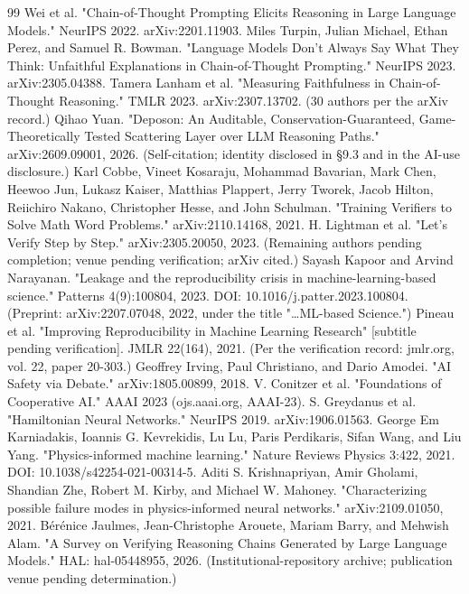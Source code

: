 \documentclass[11pt,a4paper]{article}
\begin{document}
\begin{thebibliography}{99}
 Wei et al. "Chain-of-Thought Prompting Elicits Reasoning in Large Language Models." NeurIPS 2022. arXiv:2201.11903.
 Miles Turpin, Julian Michael, Ethan Perez, and Samuel R. Bowman. "Language Models Don't Always Say What They Think: Unfaithful Explanations in Chain-of-Thought Prompting." NeurIPS 2023. arXiv:2305.04388.
 Tamera Lanham et al. "Measuring Faithfulness in Chain-of-Thought Reasoning." TMLR 2023. arXiv:2307.13702. (30 authors per the arXiv record.)
 Qihao Yuan. "Deposon: An Auditable, Conservation-Guaranteed, Game-Theoretically Tested Scattering Layer over LLM Reasoning Paths." arXiv:2609.09001, 2026. (Self-citation; identity disclosed in §9.3 and in the AI-use disclosure.)
 Karl Cobbe, Vineet Kosaraju, Mohammad Bavarian, Mark Chen, Heewoo Jun, Lukasz Kaiser, Matthias Plappert, Jerry Tworek, Jacob Hilton, Reiichiro Nakano, Christopher Hesse, and John Schulman. "Training Verifiers to Solve Math Word Problems." arXiv:2110.14168, 2021.
 H. Lightman et al. "Let's Verify Step by Step." arXiv:2305.20050, 2023. (Remaining authors pending completion; venue pending verification; arXiv cited.)
 Sayash Kapoor and Arvind Narayanan. "Leakage and the reproducibility crisis in machine-learning-based science." Patterns 4(9):100804, 2023. DOI: 10.1016/j.patter.2023.100804. (Preprint: arXiv:2207.07048, 2022, under the title "…ML-based Science.")
 Pineau et al. "Improving Reproducibility in Machine Learning Research" [subtitle pending verification]. JMLR 22(164), 2021. (Per the verification record: jmlr.org, vol. 22, paper 20-303.)
 Geoffrey Irving, Paul Christiano, and Dario Amodei. "AI Safety via Debate." arXiv:1805.00899, 2018.
 V. Conitzer et al. "Foundations of Cooperative AI." AAAI 2023 (ojs.aaai.org, AAAI-23).
 S. Greydanus et al. "Hamiltonian Neural Networks." NeurIPS 2019. arXiv:1906.01563.
 George Em Karniadakis, Ioannis G. Kevrekidis, Lu Lu, Paris Perdikaris, Sifan Wang, and Liu Yang. "Physics-informed machine learning." Nature Reviews Physics 3:422, 2021. DOI: 10.1038/s42254-021-00314-5.
 Aditi S. Krishnapriyan, Amir Gholami, Shandian Zhe, Robert M. Kirby, and Michael W. Mahoney. "Characterizing possible failure modes in physics-informed neural networks." arXiv:2109.01050, 2021.
 Bérénice Jaulmes, Jean-Christophe Arouete, Mariam Barry, and Mehwish Alam. "A Survey on Verifying Reasoning Chains Generated by Large Language Models." HAL: hal-05448955, 2026. (Institutional-repository archive; publication venue pending determination.)

\end{thebibliography}
\end{document}
